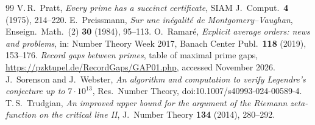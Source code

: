 \documentclass[11pt,colorlinks]{charlie}
\begin{document}
\begin{thebibliography}{99}
 V.\,R.~Pratt, \emph{Every prime has a succinct certificate}, SIAM J.\ Comput.\ \textbf{4} (1975), 214--220.
 E.~Preissmann, \emph{Sur une in\'egalit\'e de Montgomery--Vaughan}, Enseign.\ Math.\ (2) \textbf{30} (1984), 95--113.
 O.~Ramar\'e, \emph{Explicit average orders: news and problems}, in: Number Theory Week 2017, Banach Center Publ.\ \textbf{118} (2019), 153--176.
 \emph{Record gaps between primes}, table of maximal prime gaps, \url{https://pzktupel.de/RecordGaps/GAP01.php}, accessed November 2026.
 J.~Sorenson and J.~Webster, \emph{An algorithm and computation to verify Legendre's conjecture up to $7\cdot10^{13}$}, Res.\ Number Theory, doi:10.1007/s40993-024-00589-4.
 T.\,S.~Trudgian, \emph{An improved upper bound for the argument of the Riemann zeta-function on the critical line II}, J.\ Number Theory \textbf{134} (2014), 280--292.
\end{thebibliography}
\end{document}
